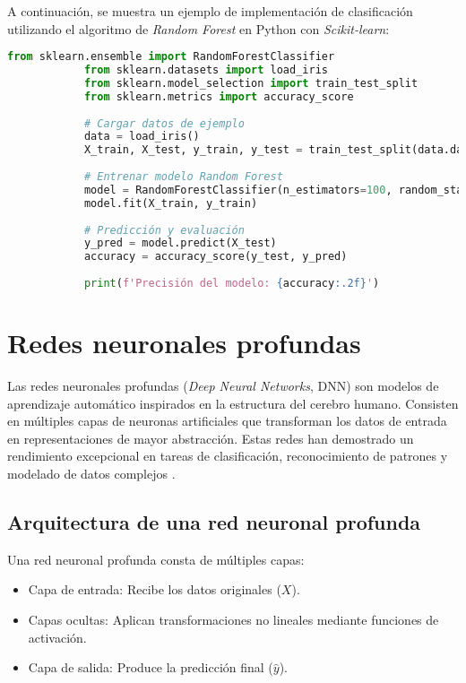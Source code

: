 \begin{itemize}
		A continuación, se muestra un ejemplo de implementación de clasificación utilizando el algoritmo de \textit{Random Forest} en Python con \textit{Scikit-learn}:
		
		\begin{lstlisting}[language=Python, caption={Clasificación con Random Forest en Python}]
			from sklearn.ensemble import RandomForestClassifier
			from sklearn.datasets import load_iris
			from sklearn.model_selection import train_test_split
			from sklearn.metrics import accuracy_score
			
			# Cargar datos de ejemplo
			data = load_iris()
			X_train, X_test, y_train, y_test = train_test_split(data.data, data.target, test_size=0.2, random_state=42)
			
			# Entrenar modelo Random Forest
			model = RandomForestClassifier(n_estimators=100, random_state=42)
			model.fit(X_train, y_train)
			
			# Predicción y evaluación
			y_pred = model.predict(X_test)
			accuracy = accuracy_score(y_test, y_pred)
			
			print(f'Precisión del modelo: {accuracy:.2f}')
		\end{lstlisting}
		
		\section{Redes neuronales profundas}
		
		Las redes neuronales profundas (\textit{Deep Neural Networks}, DNN) son modelos de aprendizaje automático inspirados en la estructura del cerebro humano. Consisten en múltiples capas de neuronas artificiales que transforman los datos de entrada en representaciones de mayor abstracción. Estas redes han demostrado un rendimiento excepcional en tareas de clasificación, reconocimiento de patrones y modelado de datos complejos \cite{goodfellow2016deep}.
		
		\subsection{Arquitectura de una red neuronal profunda}
		
		Una red neuronal profunda consta de múltiples capas:
		
		\begin{itemize}
			\item Capa de entrada: Recibe los datos originales (\(X\)).
			\item Capas ocultas: Aplican transformaciones no lineales mediante funciones de activación.
			\item Capa de salida: Produce la predicción final (\(\hat{y}\)).
		\end{itemize}
		

\end{itemize}
